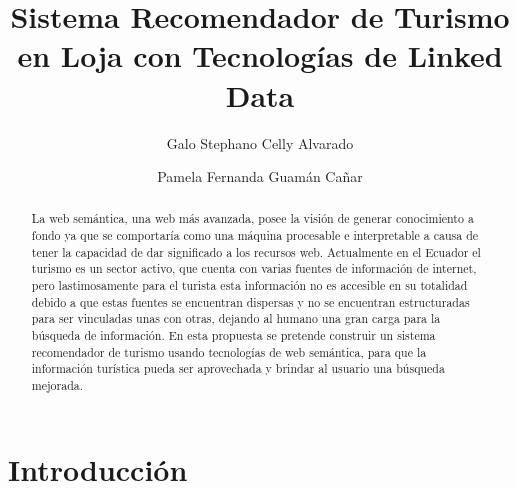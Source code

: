 \documentclass[lnbip,sechang,a4paper]{svmultln}
\begin{document}
%
\mainmatter              %
%
\title{Sistema Recomendador de Turismo en Loja con  Tecnologías de Linked Data}
%
%
\author{Galo Stephano Celly Alvarado \and Pamela Fernanda Guamán Cañar}
%
%
%

\maketitle     %

\begin{abstract}        %
La web semántica, una web más avanzada, posee la visión de generar conocimiento a fondo ya que se comportaría como una máquina procesable e interpretable a causa de tener la capacidad de dar significado a los recursos web.  Actualmente en el Ecuador el turismo es un sector activo, que cuenta con varias fuentes de información de internet, pero lastimosamente para el turista esta información no es accesible en su totalidad debido a que estas fuentes se encuentran dispersas y no se encuentran estructuradas para ser vinculadas unas con otras, dejando al humano una gran carga para la búsqueda de información. 
En esta propuesta se pretende construir un sistema recomendador de turismo usando tecnologías de web semántica, para que la información turística pueda ser aprovechada y brindar al usuario una búsqueda mejorada.
\end{abstract}
%
\section{Introducción}
\end{document}
